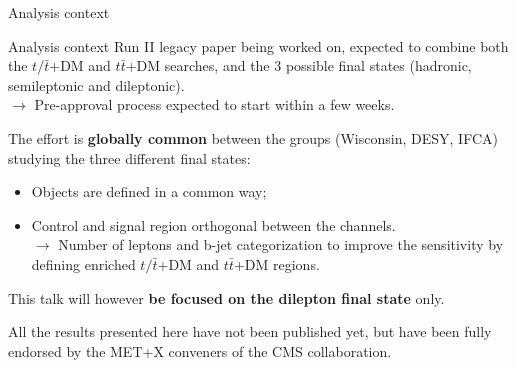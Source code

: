 \documentclass[8pt]{beamer}
\begin{document}
\begin{frame}[standout]
Analysis context
\end{frame}

\begin{frame}{Analysis context}
\justifying
Run II legacy paper being worked on, expected to \alert{combine both the $t/\bar t$+DM and $t \bar t$+DM searches}, and the 3 possible final states (hadronic, semileptonic and dileptonic). \\
\hspace{10pt} $\rightarrow$ Pre-approval process expected to start within a few weeks. \vfill

The effort is \textbf{globally common} between the groups (Wisconsin, DESY, IFCA) studying the three different final states:
\begin{itemize}
\justifying
\item Objects are defined in a common way;
\item Control and signal region orthogonal between the channels.\\
$\rightarrow$ Number of leptons and b-jet categorization to improve the sensitivity by defining enriched $t/\bar t$+DM and $t \bar t$+DM regions.
\end{itemize} \vfill

This talk will however \textbf{be focused on the dilepton final state} only. \vfill
\begin{block}{}
\begin{center}
All the results presented here have not been published yet, but have been fully endorsed by the MET+X conveners of the CMS collaboration.
\end{center}
\end{block} \vfill
\end{frame}
\end{document}
